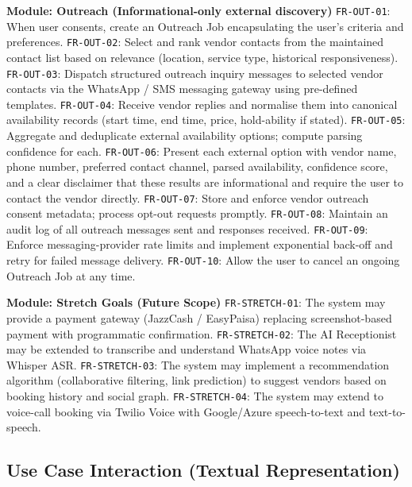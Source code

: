 \begin{outline}
  \1 \textbf{Module: Outreach (Informational-only external discovery)}
  \2 \texttt{FR-OUT-01}: When user consents, create an Outreach Job encapsulating
       the user's criteria and preferences.
  \2 \texttt{FR-OUT-02}: Select and rank vendor contacts from the maintained contact
       list based on relevance (location, service type, historical responsiveness).
  \2 \texttt{FR-OUT-03}: Dispatch structured outreach inquiry messages to selected
       vendor contacts via the WhatsApp / SMS messaging gateway using pre-defined
       templates.
  \2 \texttt{FR-OUT-04}: Receive vendor replies and normalise them into canonical
       availability records (start time, end time, price, hold-ability if stated).
  \2 \texttt{FR-OUT-05}: Aggregate and deduplicate external availability options;
       compute parsing confidence for each.
  \2 \texttt{FR-OUT-06}: Present each external option with vendor name, phone number,
       preferred contact channel, parsed availability, confidence score, and a clear
       disclaimer that these results are informational and require the user to contact
       the vendor directly.
  \2 \texttt{FR-OUT-07}: Store and enforce vendor outreach consent metadata;
       process opt-out requests promptly.
  \2 \texttt{FR-OUT-08}: Maintain an audit log of all outreach messages sent and
       responses received.
  \2 \texttt{FR-OUT-09}: Enforce messaging-provider rate limits and implement
       exponential back-off and retry for failed message delivery.
  \2 \texttt{FR-OUT-10}: Allow the user to cancel an ongoing Outreach Job at any
       time.

  \1 \textbf{Module: Stretch Goals (Future Scope)}
  \2 \texttt{FR-STRETCH-01}: The system may provide a payment gateway (JazzCash /
       EasyPaisa) replacing screenshot-based payment with programmatic confirmation.
  \2 \texttt{FR-STRETCH-02}: The AI Receptionist may be extended to transcribe and
       understand WhatsApp voice notes via Whisper ASR.
  \2 \texttt{FR-STRETCH-03}: The system may implement a recommendation algorithm
       (collaborative filtering, link prediction) to suggest vendors based on booking
       history and social graph.
  \2 \texttt{FR-STRETCH-04}: The system may extend to voice-call booking via Twilio
       Voice with Google/Azure speech-to-text and text-to-speech.

\end{outline}

\subsection{Use Case Interaction (Textual Representation)}

